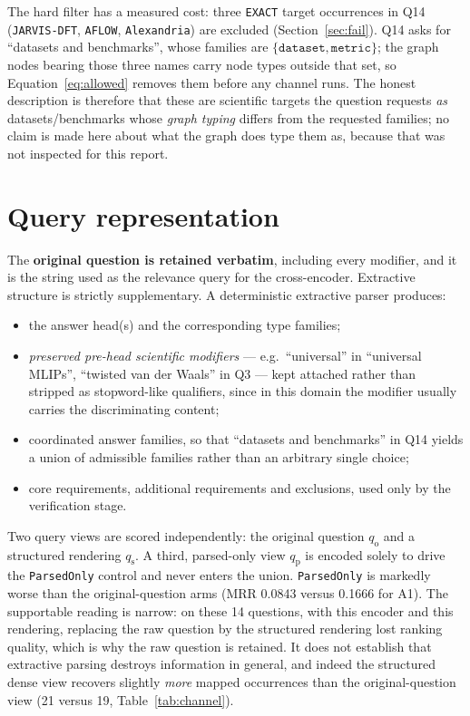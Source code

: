 \documentclass[11pt,a4paper]{article}
\begin{document}
The hard filter has a measured cost: three \texttt{EXACT} target occurrences in Q14 (\texttt{JARVIS-DFT},
\texttt{AFLOW}, \texttt{Alexandria}) are excluded (Section~\ref{sec:fail}). Q14 asks for ``datasets and
benchmarks'', whose families are $\{\texttt{dataset}, \texttt{metric}\}$; the graph nodes bearing those three
names carry node types outside that set, so Equation~\eqref{eq:allowed} removes them before any channel runs.
The honest description is therefore that these are scientific targets the question requests \emph{as}
datasets/benchmarks whose \emph{graph typing} differs from the requested families; no claim is made here
about what the graph does type them as, because that was not inspected for this report.

\section{Query representation}

The \textbf{original question is retained verbatim}, including every modifier, and it is the string used as
the relevance query for the cross-encoder. Extractive structure is strictly supplementary. A deterministic
extractive parser produces:

\begin{itemize}
\item the answer head(s) and the corresponding type families;
\item \emph{preserved pre-head scientific modifiers} --- e.g.\ ``universal'' in ``universal MLIPs'',
``twisted van der Waals'' in Q3 --- kept attached rather than stripped as stopword-like qualifiers, since in
this domain the modifier usually carries the discriminating content;
\item coordinated answer families, so that ``datasets and benchmarks'' in Q14 yields a union of admissible
families rather than an arbitrary single choice;
\item core requirements, additional requirements and exclusions, used only by the verification stage.
\end{itemize}

Two query views are scored independently: the original question $q_{\text{o}}$ and a structured rendering
$q_{\text{s}}$. A third, parsed-only view $q_{\text{p}}$ is encoded solely to drive the
\texttt{ParsedOnly} control and never enters the union. \texttt{ParsedOnly} is markedly worse than the
original-question arms (MRR 0.0843 versus 0.1666 for A1). The supportable reading is narrow: on these 14
questions, with this encoder and this rendering, replacing the raw question by the structured rendering lost
ranking quality, which is why the raw question is retained. It does not establish that extractive parsing
destroys information in general, and indeed the structured dense view recovers slightly \emph{more} mapped
occurrences than the original-question view (21 versus 19, Table~\ref{tab:channel}).
\end{document}
